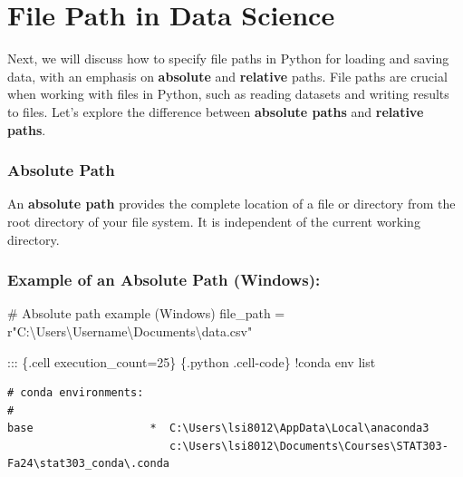 \documentclass[
  letterpaper,
  DIV=11,
  numbers=noendperiod]{scrreprt}
\newenvironment{Shaded}{\begin{snugshade}}{\end{snugshade}}
\newcommand{\BuiltInTok}[1]{\textcolor[rgb]{0.00,0.23,0.31}{#1}}
\newcommand{\CommentTok}[1]{\textcolor[rgb]{0.37,0.37,0.37}{#1}}
\newcommand{\DecValTok}[1]{\textcolor[rgb]{0.68,0.00,0.00}{#1}}
\newcommand{\NormalTok}[1]{\textcolor[rgb]{0.00,0.23,0.31}{#1}}
\newcommand{\OperatorTok}[1]{\textcolor[rgb]{0.37,0.37,0.37}{#1}}
\newcommand{\VerbatimStringTok}[1]{\textcolor[rgb]{0.13,0.47,0.30}{#1}}
\begin{document}
\hypertarget{file-path-in-data-science}{%
\section{File Path in Data Science}\label{file-path-in-data-science}}

Next, we will discuss how to specify file paths in Python for loading
and saving data, with an emphasis on \textbf{absolute} and
\textbf{relative} paths. File paths are crucial when working with files
in Python, such as reading datasets and writing results to files. Let's
explore the difference between \textbf{absolute paths} and
\textbf{relative paths}.

\hypertarget{absolute-path}{%
\subsubsection{Absolute Path}\label{absolute-path}}

An \textbf{absolute path} provides the complete location of a file or
directory from the root directory of your file system. It is independent
of the current working directory.

\hypertarget{example-of-an-absolute-path-windows}{%
\subsubsection{Example of an Absolute Path
(Windows):}\label{example-of-an-absolute-path-windows}}

\begin{Shaded}
\begin{Highlighting}[]
\CommentTok{\# Absolute path example (Windows)}
\NormalTok{file\_path }\OperatorTok{=} \VerbatimStringTok{r"C:\textbackslash{}Users\textbackslash{}Username\textbackslash{}Documents\textbackslash{}data.csv"}

\NormalTok{::: \{.cell execution\_count}\OperatorTok{=}\DecValTok{25}\NormalTok{\}}
\NormalTok{\textasciigrave{}\textasciigrave{}\textasciigrave{} \{.python .cell}\OperatorTok{{-}}\NormalTok{code\}}
\OperatorTok{!}\NormalTok{conda env }\BuiltInTok{list}
\end{Highlighting}
\end{Shaded}

\begin{verbatim}
# conda environments:
#
base                  *  C:\Users\lsi8012\AppData\Local\anaconda3
                         c:\Users\lsi8012\Documents\Courses\STAT303-Fa24\stat303_conda\.conda
\end{verbatim}
\end{document}
